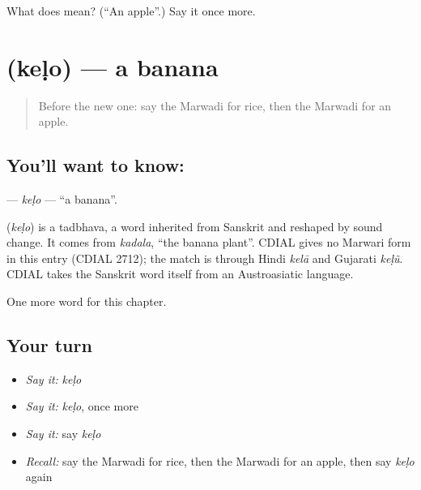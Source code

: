 \begin{tcolorbox}[breakable,colback=teal!4,colframe=teal!35!black,title={Before you move on}]
What does  mean? (\textquotedblleft{}An apple\textquotedblright{}.) Say it once more.
\end{tcolorbox}
\section[\texorpdfstring{\mw{केळो} (keḷo)}{केळो (keḷo)}]{ (keḷo) — a banana}

\label{lesson:MW-C59-kelo}



\begin{quote}
Before the new one: say the Marwadi for rice, then the Marwadi for an apple.
\end{quote}

\subsection*{You'll want to know: }
\textbf{} — \emph{keḷo} — \textquotedblleft{}a banana\textquotedblright{}.

\begin{cousinweb}
\textbf{} (\emph{keḷo}) is a tadbhava, a word inherited from Sanskrit and reshaped by sound change. It comes from \emph{kadala}, \textquotedblleft{}the banana plant\textquotedblright{}. CDIAL gives no Marwari form in this entry (CDIAL 2712); the match is through Hindi \emph{kelā} and Gujarati \emph{keḷũ}. CDIAL takes the Sanskrit word itself from an Austroasiatic language.
\end{cousinweb}

\begin{grammarlens}[title={What you've built}]
One more word for this chapter.
\end{grammarlens}

\subsection*{Your turn}
\begin{itemize}
\raggedright
  \item \emph{Say it:} \emph{keḷo}
  \item \emph{Say it:} \emph{keḷo}, once more
  \item \emph{Say it:} say \emph{keḷo}
  \item \emph{Recall:} say the Marwadi for rice, then the Marwadi for an apple, then say \emph{keḷo} again
\end{itemize}

